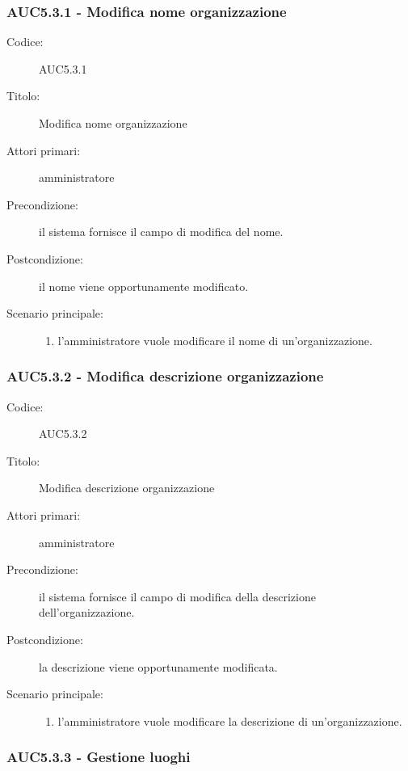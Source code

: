 \documentclass[../analisi-dei-requisiti.tex]{subfiles}
\begin{document}
\subsubsection{AUC5.3.1 - Modifica nome organizzazione}%
\label{subsub:AUC5.3.1}
\begin{description}
  \item[Codice:] AUC5.3.1
  \item[Titolo:] Modifica nome organizzazione
  \item[Attori primari:] amministratore
  \item[Precondizione:] il sistema fornisce il campo di modifica del nome.
  \item[Postcondizione:] il nome viene opportunamente modificato.
  \item[Scenario principale:]
  \begin{enumerate}
    \item l'amministratore vuole modificare il nome di un'organizzazione.
  \end{enumerate}
\end{description}

\subsubsection{AUC5.3.2 - Modifica descrizione organizzazione}%
\label{subsub:AUC5.3.2}
\begin{description}
  \item[Codice:] AUC5.3.2
  \item[Titolo:] Modifica descrizione organizzazione
  \item[Attori primari:] amministratore
  \item[Precondizione:] il sistema fornisce il campo di modifica della descrizione dell'organizzazione.
  \item[Postcondizione:] la descrizione viene opportunamente modificata.
  \item[Scenario principale:]
  \begin{enumerate}
    \item l'amministratore vuole modificare la descrizione di un'organizzazione.
  \end{enumerate}
\end{description}

\subsubsection{AUC5.3.3 - Gestione luoghi}%
\label{subsub:AUC5.3.3}
\end{document}
